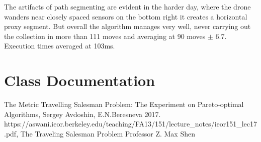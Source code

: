 \documentclass[10pt,a4paper]{article}
\begin{document}
The artifacts of path segmenting are evident in the harder day, where the drone wanders near closely spaced sensors on the bottom right it creates a horizontal 
proxy segment. But overall the algorithm manages very well, never carrying out the collection in more than 111 moves and averaging at 90 moves $\pm$ 6.7. Execution times averaged at 103ms.

\section{Class Documentation}



\normalsize
\begin{thebibliography}{9}

The Metric Travelling Salesman Problem:
The Experiment on Pareto-optimal
Algorithms,
Sergey Avdoshin, E.N.Beresneva
2017.
https://aswani.ieor.berkeley.edu/teaching/FA13/151/lecture\_notes/ieor151\_lec17.pdf,
The Traveling Salesman Problem
Professor Z. Max Shen

\end{thebibliography}
\end{document}
